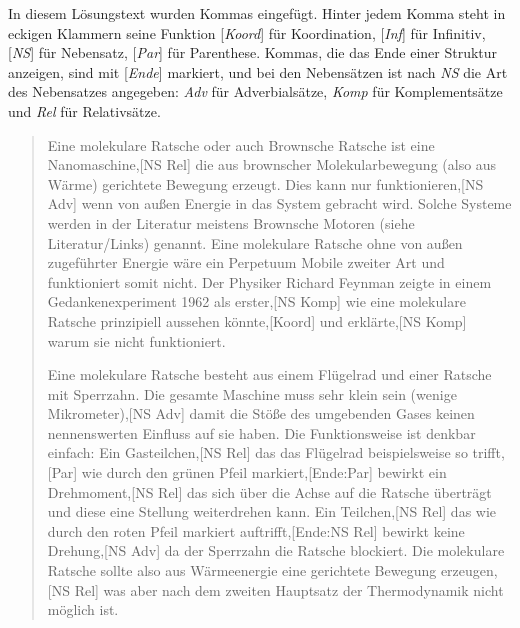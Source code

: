 \label{sol:morphosyntaktischeschreibprinzipien02} In diesem Lösungstext wurden Kommas eingefügt.
Hinter jedem Komma steht in eckigen Klammern seine Funktion [\textit{Koord}] für Koordination, [\textit{Inf}] für Infinitiv, [\textit{NS}] für Nebensatz, [\textit{Par}] für Parenthese.
Kommas, die das Ende einer Struktur anzeigen, sind mit [\textit{Ende}] markiert, und bei den Nebensätzen ist nach \textit{NS} die Art des Nebensatzes angegeben: \textit{Adv} für Adverbialsätze, \textit{Komp} für Komplementsätze und \textit{Rel} für Relativsätze.

\vspace{0.5cm}

\begin{sloppypar}
\begin{quote}
Eine molekulare Ratsche oder auch Brownsche Ratsche ist eine Nanomaschine,[NS Rel] die aus brownscher Molekularbewegung (also aus Wärme) gerichtete Bewegung erzeugt.
Dies kann nur funktionieren,[NS Adv] wenn von außen Energie in das System gebracht wird.
Solche Systeme werden in der Literatur meistens Brownsche Motoren (siehe Literatur/Links) genannt.
Eine molekulare Ratsche ohne von außen zugeführter Energie wäre ein Perpetuum Mobile zweiter Art und funktioniert somit nicht.
Der Physiker Richard Feynman zeigte in einem Gedankenexperiment 1962 als erster,[NS Komp] wie eine molekulare Ratsche prinzipiell aussehen könnte,[Koord] und erklärte,[NS Komp] warum sie nicht funktioniert.

Eine molekulare Ratsche besteht aus einem Flügelrad und einer Ratsche mit Sperrzahn.
Die gesamte Maschine muss sehr klein sein (wenige Mikrometer),[NS Adv] damit die Stöße des umgebenden Gases keinen nennenswerten Einfluss auf sie haben.
Die Funktionsweise ist denkbar einfach:
Ein Gasteilchen,[NS Rel] das das Flügelrad beispielsweise so trifft,[Par] wie durch den grünen Pfeil markiert,[Ende:Par] bewirkt ein Drehmoment,[NS Rel] das sich über die Achse auf die Ratsche überträgt und diese eine Stellung weiterdrehen kann.
Ein Teilchen,[NS Rel] das wie durch den roten Pfeil markiert auftrifft,[Ende:NS Rel] bewirkt keine Drehung,[NS Adv] da der Sperrzahn die Ratsche blockiert.
Die molekulare Ratsche sollte also aus Wärmeenergie eine gerichtete Bewegung erzeugen,[NS Rel] was aber nach dem zweiten Hauptsatz der Thermodynamik nicht möglich ist.


\end{quote}
\end{sloppypar}
